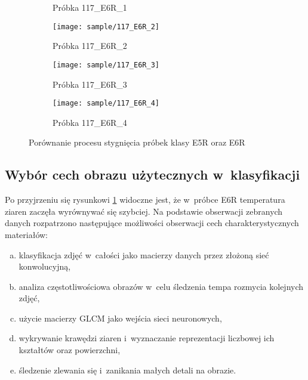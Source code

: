 \begin{figure}[htbp]
\begin{subfigure}{0.3\textwidth}
		\caption{Próbka 117\_E6R\_1}
	\end{subfigure}
	\hspace{0.25cm}
	\vspace{0.5cm}
	\begin{subfigure}{0.3\textwidth}
		\centering
		\texttt{[image: sample/117\_E6R\_2]}
		\caption{Próbka 117\_E6R\_2}
	\end{subfigure}
	\hspace{0.25cm}
	\begin{subfigure}{0.3\textwidth}
		\centering
		\texttt{[image: sample/117\_E6R\_3]}
		\caption{Próbka 117\_E6R\_3}
	\end{subfigure}
	\begin{subfigure}{0.3\textwidth}
		\centering
		\texttt{[image: sample/117\_E6R\_4]}
		\caption{Próbka 117\_E6R\_4}
	\end{subfigure}
	\caption{Porównanie procesu stygnięcia próbek klasy E5R oraz E6R}
	\label{fig:samplecompare}
\end{figure}

\subsection{Wybór cech obrazu użytecznych w~klasyfikacji}
\label{subsec:featureextr}
Po przyjrzeniu się rysunkowi \ref{fig:samplecompare} widoczne  jest, że
w~próbce E6R temperatura ziaren zaczęła wyrównywać się szybciej.
Na podstawie obserwacji zebranych danych rozpatrzono następujące możliwości
obserwacji cech charakterystycznych materiałów:
\begin{enumerate}[a)]
	\item \label{it:imgcnn} 
	      klasyfikacja zdjęć w~całości jako macierzy danych przez złożoną sieć
	      konwolucyjną,
	\item \label{it:fft} 
	      analiza częstotliwościowa obrazów w~celu śledzenia tempa rozmycia
	      kolejnych zdjęć,
	\item \label{it:glcm} 
	      użycie macierzy GLCM jako wejścia sieci neuronowych,
	\item \label{it:edge}
	      wykrywanie krawędzi ziaren i~wyznaczanie reprezentacji liczbowej
	      ich kształtów oraz powierzchni,
	\item \label{it:blob}
	      śledzenie zlewania się i~zanikania małych detali na obrazie.
\end{enumerate}

